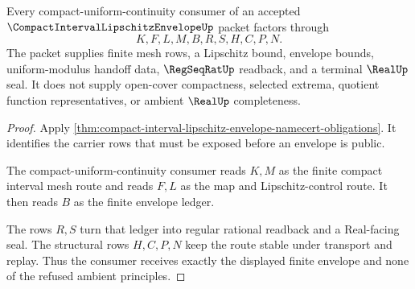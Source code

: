 \begin{theorem}
\label{thm:compact-interval-lipschitz-envelope-uniform-route}
Every compact-uniform-continuity consumer of an accepted $\CompactIntervalLipschitzEnvelopeUp$ packet factors through
$$
K,F,L,M,B,R,S,H,C,P,N .
$$
The packet supplies finite mesh rows, a Lipschitz bound, envelope bounds, uniform-modulus handoff data, $\RegSeqRatUp$ readback, and a terminal $\RealUp$ seal. It does not supply open-cover compactness, selected extrema, quotient function representatives, or ambient $\RealUp$ completeness.
\end{theorem}
\begin{proof}
Apply \autoref{thm:compact-interval-lipschitz-envelope-namecert-obligations}. It identifies the carrier rows that must be exposed before an envelope is public.

The compact-uniform-continuity consumer reads $K,M$ as the finite compact interval mesh route and reads $F,L$ as the map and Lipschitz-control route. It then reads $B$ as the finite envelope ledger.

The rows $R,S$ turn that ledger into regular rational readback and a Real-facing seal. The structural rows $H,C,P,N$ keep the route stable under transport and replay. Thus the consumer receives exactly the displayed finite envelope and none of the refused ambient principles.
\end{proof}




